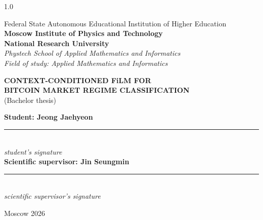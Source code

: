 \documentclass[14pt,a4paper]{extarticle}
\begin{document}
\begin{titlepage}
\thispagestyle{empty}
\begin{spacing}{1.0}
\vspace*{0.85cm}
\begin{center}
Federal State Autonomous Educational Institution of Higher Education\\
\textbf{\fontsize{17pt}{19pt}\selectfont Moscow Institute of Physics and Technology}\\[0.12cm]
\textbf{\fontsize{16pt}{18pt}\selectfont National Research University}\\[1.45cm]
{\small\textit{Phystech School of Applied Mathematics and Informatics}}\\
{\small\textit{Field of study: Applied Mathematics and Informatics}}\\[0.35cm]
\end{center}


\vspace{1.45cm}
\begin{center}
{\bfseries\fontsize{16.5pt}{16.5pt}\selectfont CONTEXT-CONDITIONED FiLM FOR\\
BITCOIN MARKET REGIME CLASSIFICATION}\\[0.08cm]
(Bachelor thesis)
\end{center}

\vspace{1.0cm}
\begin{flushright}
\begin{minipage}{0.56\textwidth}
{\fontsize{12.5pt}{14pt}\selectfont\textbf{Student: Jeong Jaehyeon}}\\[0.16cm]
\rule{\textwidth}{0.4pt}\\[-0.05cm]
{\small\textit{student's signature}}\\[0.30cm]

{\fontsize{12.5pt}{14pt}\selectfont\textbf{Scientific supervisor: Jin Seungmin}}\\[0.16cm]
\rule{\textwidth}{0.4pt}\\[-0.05cm]
{\small\textit{scientific supervisor's signature}}\\[0.30cm]
\end{minipage}
\end{flushright}

\vfill
\begin{center}
Moscow 2026
\end{center}
\end{spacing}
\end{titlepage}
\end{document}
